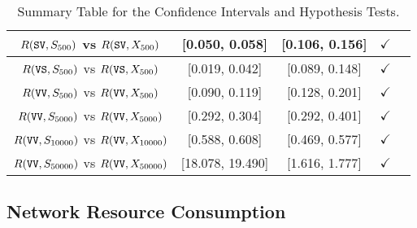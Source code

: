 \documentclass{sig-alternate}
\begin{document}
\begin{table*}[t]
\begin{center}
\begin{tabular}{cccc|c|}
\hline
\multicolumn{1}{|c||}{$R(\mbox{\texttt{SV}},S_{500})$ vs $R(\mbox{\texttt{SV}},X_{500})$}& \multicolumn{1}{|c|}{[0.050, 0.058]} & \multicolumn{1}{|c|}{[0.106, 0.156]} & $\checkmark$ & \\

\hline
\multicolumn{1}{|c||}{$R(\mbox{\texttt{VS}},S_{500})$ vs $R(\mbox{\texttt{VS}},X_{500})$} & \multicolumn{1}{|c|}{[0.019, 0.042]} & \multicolumn{1}{|c|}{[0.089, 0.148]} & $\checkmark$ & \\

\hline
\multicolumn{1}{|c||}{$R(\mbox{\texttt{VV}},S_{500})$ vs $R(\mbox{\texttt{VV}},X_{500})$} & \multicolumn{1}{|c|}{[0.090, 0.119]} & \multicolumn{1}{|c|}{[0.128, 0.201]} & $\checkmark$ & \\

\hline
\multicolumn{1}{|c||}{$R(\mbox{\texttt{VV}},S_{5000})$ vs $R(\mbox{\texttt{VV}},X_{5000})$} & \multicolumn{1}{|c|}{[0.292, 0.304]} & \multicolumn{1}{|c|}{[0.292, 0.401]} & $\checkmark$ & \\

\hline
\multicolumn{1}{|c||}{$ R(\mbox{\texttt{VV}},S_{10000})$ vs $ R(\mbox{\texttt{VV}},X_{10000})$} & \multicolumn{1}{|c|}{[0.588, 0.608]} & \multicolumn{1}{|c|}{[0.469, 0.577]} & $\checkmark$ & \\

\hline
\multicolumn{1}{|c||}{$ R(\mbox{\texttt{VV}},S_{50000})$ vs $ R(\mbox{\texttt{VV}},X_{50000})$} & \multicolumn{1}{|c|}{[18.078, 19.490]} & \multicolumn{1}{|c|}{[1.616, 1.777]} & $\checkmark$ & \\

\hline
\end{tabular}

\vspace*{.15in}


\end{center}

\vspace*{-.15in}

\caption{Summary Table for the Confidence Intervals and Hypothesis Tests.}
\label{tab:XMLResults}

\vspace*{-.1in}

\end{table*}

\subsection{Network Resource Consumption}
\label{sec:space}
\end{document}
